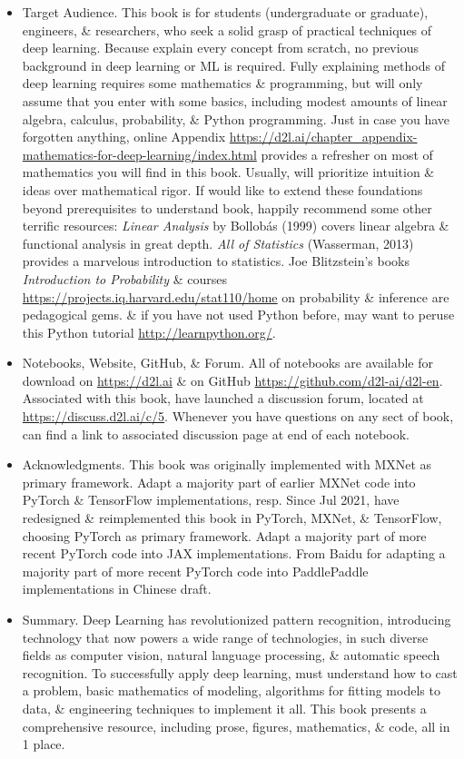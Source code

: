 \documentclass{article}
\begin{document}
\begin{enumerate}
\begin{itemize}
\begin{itemize}
\begin{itemize}
				\item {\sf Target Audience.} This book is for students (undergraduate or graduate), engineers, \& researchers, who seek a solid grasp of practical techniques of deep learning. Because explain every concept from scratch, no previous background in deep learning or ML is required. Fully explaining methods of deep learning requires some mathematics \& programming, but will only assume that you enter with some basics, including modest amounts of linear algebra, calculus, probability, \& Python programming. Just in case you have forgotten anything, online Appendix \url{https://d2l.ai/chapter_appendix-mathematics-for-deep-learning/index.html} provides a refresher on most of mathematics you will find in this book. Usually, will prioritize intuition \& ideas over mathematical rigor. If would like to extend these foundations beyond prerequisites to understand book, happily recommend some other terrific resources: {\it Linear Analysis} by {\sc Bollob\'as} (1999) covers linear algebra \& functional analysis in great depth. {\it All of Statistics} (Wasserman, 2013) provides a marvelous introduction to statistics. {\sc Joe Blitzstein}'s books {\it Introduction to Probability} \& courses \url{https://projects.iq.harvard.edu/stat110/home} on probability \& inference are pedagogical gems. \& if you have not used Python before, may want to peruse this Python tutorial \url{http://learnpython.org/}.
				\item {\sf Notebooks, Website, GitHub, \& Forum.} All of notebooks are available for download on \url{https://d2l.ai} \& on GitHub \url{https://github.com/d2l-ai/d2l-en}. Associated with this book, have launched a discussion forum, located at \url{https://discuss.d2l.ai/c/5}. Whenever you have questions on any sect of book, can find a link to associated discussion page at end of each notebook.
				\item {\sf Acknowledgments.} This book was originally implemented with MXNet as primary framework. Adapt a majority part of earlier MXNet code into PyTorch \& TensorFlow implementations, resp. Since Jul 2021, have redesigned \& reimplemented this book in PyTorch, MXNet, \& TensorFlow, choosing PyTorch as primary framework. Adapt a majority part of more recent PyTorch code into JAX implementations. From Baidu for adapting a majority part of more recent PyTorch code into PaddlePaddle implementations in Chinese draft.
				\item {\sf Summary.} Deep Learning has revolutionized pattern recognition, introducing technology that now powers a wide range of technologies, in such diverse fields as computer vision, natural language processing, \& automatic speech recognition. To successfully apply deep learning, must understand how to cast a problem, basic mathematics of modeling, algorithms for fitting models to data, \& engineering techniques to implement it all. This book presents a comprehensive resource, including prose, figures, mathematics, \& code, all in 1 place.

\end{itemize}
\end{itemize}
\end{itemize}
\end{enumerate}
\end{document}
